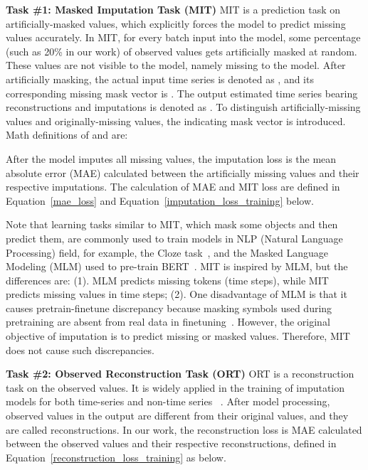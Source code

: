 \documentclass{article}
\begin{document}
\textbf{Task \#1: Masked Imputation Task (MIT)} \hspace{1em}
MIT is a prediction task on artificially-masked values, which explicitly forces the model to predict missing values accurately. In MIT, for every batch input into the model, some percentage (such as 20\% in our work) of observed values gets artificially masked at random. These values are not visible to the model, namely missing to the model. After artificially masking, the actual input time series is denoted as , and its corresponding missing mask vector is . The output estimated time series bearing reconstructions and imputations is denoted as . To distinguish artificially-missing values and originally-missing values, the indicating mask vector  is introduced. Math definitions of  and  are: 



After the model imputes all missing values, the imputation loss is the mean absolute error (MAE) calculated between the artificially missing values and their respective imputations. The calculation of MAE and MIT loss are defined in Equation~\ref{mae_loss} and Equation~\ref{imputation_loss_training} below.




Note that learning tasks similar to MIT, which mask some objects and then predict them, are commonly used to train models in NLP (Natural Language Processing) field, for example, the Cloze task~\cite{Taylor1953ClozeTask}, and the Masked Language Modeling (MLM) used to pre-train BERT~\cite{Devlin2019BERT}. MIT is inspired by MLM, but the differences are: (1). MLM predicts missing tokens (time steps), while MIT predicts missing values in time steps; (2). One disadvantage of MLM is that it causes pretrain-finetune discrepancy because masking symbols used during pretraining are absent from real data in finetuning~\cite{Yang2019XLNet}. However, the original objective of imputation is to predict missing or masked values. Therefore, MIT does not cause such discrepancies. 

\textbf{Task \#2: Observed Reconstruction Task (ORT)} \hspace{1em}
ORT is a reconstruction task on the observed values. It is widely applied in the training of imputation models for both time-series and non-time series ~\cite{Cao2018BRITS,Luo2018GRUI,Luo2019E2GAN,Fortuin2020GPVAE,Yoon2018GAIN,Li2018MisGAN}. After model processing, observed values in the output are different from their original values, and they are called reconstructions. In our work, the reconstruction loss is MAE calculated between the observed values and their respective reconstructions, defined in Equation~\ref{reconstruction_loss_training} as below.
\end{document}
